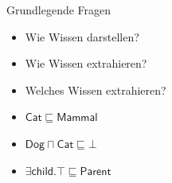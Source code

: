 \documentclass[ngerman]{beamer}
\begin{document}
\begin{frame}


  \begin{block}{Grundlegende Fragen}
    \begin{itemize}
    \item<2-> Wie Wissen darstellen? 
    \item<3-> Wie Wissen extrahieren? 
    \item<4-> Welches Wissen extrahieren? 
    \end{itemize}
  \end{block}


  \begin{Beispiel}
    \begin{itemize}
    \item<7-> $\mathsf{Cat} \sqsubseteq \mathsf{Mammal}$
    \item<8-> $\mathsf{Dog} \sqcap \mathsf{Cat} \sqsubseteq \bot$
    \item<9-> $\exists \mathsf{child}. \top \sqsubseteq \mathsf{Parent}$
    \end{itemize}
  \end{Beispiel}

\end{frame}
\end{document}

